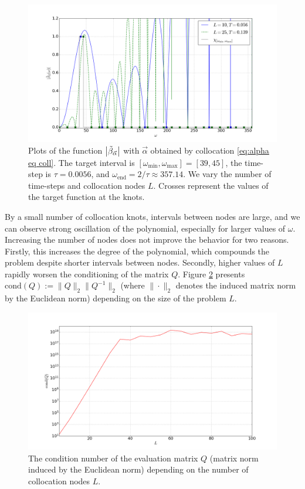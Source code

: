 \documentclass[a4paper,11pt,bibliography=totoc,listof=totoc,headinclude=true,cleardoublepage=empty,oneside]{scrbook}
\newcommand{\dffv}{\Tilde{\beta}_{\Vec{\alpha}}}
\newcommand{\e}{\mathrm{end}}
\begin{document}
\begin{figure}[h]
    \centering
    \includegraphics[width=1\linewidth]{latex//images//equi_coll/Figure_1.png}
    \caption{Plots of the function $\left|\dffv\right|$ with $\Vec{\alpha}$ obtained by collocation \eqref{eq:alpha eq coll}. The target interval is $\left[\omega_{\min}, \omega_{\max} \right] = [39, 45]$, the time-step is $\tau = 0.0056$, and $\omega_\e = 2/\tau \approx 357.14$. We vary the number of time-steps and collocation nodes $L$. Crosses represent the values of the target function at the knots.}
    \label{fig:eq coll beta}
\end{figure}

By a small number of collocation knots, intervals between nodes are large, and we can observe strong oscillation of the polynomial, especially for larger values of $\omega$. Increasing the number of nodes does not improve the behavior for two reasons. Firstly, this increases the degree of the polynomial, which compounds the problem despite shorter intervals between nodes. Secondly, higher values of $L$ rapidly worsen the conditioning of the matrix $Q$. Figure \ref{fig:eq coll cond} presents $\mathrm{cond}(Q) := \|Q\|_2 \|Q^{-1}\|_2$ (where $\| \cdot \|_2$ denotes the induced matrix norm by the Euclidean norm) depending on the size of the problem $L$.

\begin{figure}
    \centering
    \includegraphics[width=1\linewidth]{latex//images//equi_coll/Figure_2.png}
    \caption{The condition number of the evaluation matrix $Q$ (matrix norm induced by the Euclidean norm) depending on the number of collocation nodes $L$.}
    \label{fig:eq coll cond}
\end{figure}
\end{document}

